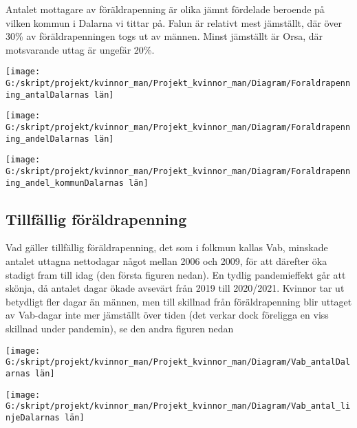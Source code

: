 \documentclass[
]{article}
\begin{document}
Antalet mottagare av föräldrapenning är olika jämnt fördelade beroende
på vilken kommun i Dalarna vi tittar på. Falun är relativt mest
jämställt, där över 30\% av föräldrapenningen togs ut av männen. Minst
jämställt är Orsa, där motsvarande uttag är ungefär 20\%.

\begin{center}\texttt{[image: G:/skript/projekt/kvinnor\_man/Projekt\_kvinnor\_man/Diagram/Foraldrapenning\_antalDalarnas län]} \end{center}

\begin{center}\texttt{[image: G:/skript/projekt/kvinnor\_man/Projekt\_kvinnor\_man/Diagram/Foraldrapenning\_andelDalarnas län]} \end{center}

\begin{center}\texttt{[image: G:/skript/projekt/kvinnor\_man/Projekt\_kvinnor\_man/Diagram/Foraldrapenning\_andel\_kommunDalarnas län]} \end{center}

\hypertarget{tillfuxe4llig-fuxf6ruxe4ldrapenning}{%
\subsection{Tillfällig
föräldrapenning}\label{tillfuxe4llig-fuxf6ruxe4ldrapenning}}

Vad gäller tillfällig föräldrapenning, det som i folkmun kallas Vab,
minskade antalet uttagna nettodagar något mellan 2006 och 2009, för att
därefter öka stadigt fram till idag (den första figuren nedan). En
tydlig pandemieffekt går att skönja, då antalet dagar ökade avsevärt
från 2019 till 2020/2021. Kvinnor tar ut betydligt fler dagar än männen,
men till skillnad från föräldrapenning blir uttaget av Vab-dagar inte
mer jämställt över tiden (det verkar dock föreligga en viss skillnad
under pandemin), se den andra figuren nedan

\begin{center}\texttt{[image: G:/skript/projekt/kvinnor\_man/Projekt\_kvinnor\_man/Diagram/Vab\_antalDalarnas län]} \end{center}

\begin{center}\texttt{[image: G:/skript/projekt/kvinnor\_man/Projekt\_kvinnor\_man/Diagram/Vab\_antal\_linjeDalarnas län]} \end{center}
\end{document}
